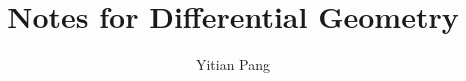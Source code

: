 \documentclass[lang=en,a4paper,11pt,openany,twoside]{elegantbook}
\newcommand{\ForceRightPage}{%
  \clearpage
  \ifodd\value{page}\relax
  \else
    \hbox{}\thispagestyle{empty}\newpage
  \fi
}
\begin{document}
\title{Notes for Differential Geometry}
\author{Yitian Pang}
\date{}
\maketitle
\setcounter{page}{1}

\frontmatter
{}     %
\clearpage
\tableofcontents
\clearpage

\ForceRightPage
\mainmatter


\end{document}
